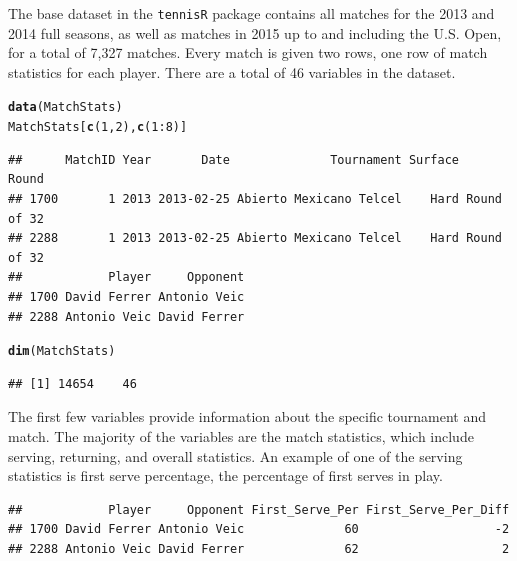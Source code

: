 \documentclass{article}\usepackage[]{graphicx}\usepackage[]{color}
\makeatletter
\newcommand{\hlnum}[1]{\textcolor[rgb]{0.686,0.059,0.569}{#1}}%
\newcommand{\hlopt}[1]{\textcolor[rgb]{0,0,0}{#1}}%
\newcommand{\hlstd}[1]{\textcolor[rgb]{0.345,0.345,0.345}{#1}}%
\newcommand{\hlkwd}[1]{\textcolor[rgb]{0.737,0.353,0.396}{\textbf{#1}}}%
\newenvironment{kframe}{%
 \def\at@end@of@kframe{}%
 \ifinner\ifhmode%
  \def\at@end@of@kframe{\end{minipage}}%
  \begin{minipage}{\columnwidth}%
 \fi\fi%
 \def\FrameCommand##1{\hskip\@totalleftmargin \hskip-\fboxsep
 \colorbox{shadecolor}{##1}\hskip-\fboxsep
     \hskip-\linewidth \hskip-\@totalleftmargin \hskip\columnwidth}%
 \MakeFramed {\advance\hsize-\width
   \@totalleftmargin\z@ \linewidth\hsize
   \@setminipage}}%
 {\par\unskip\endMakeFramed%
 \at@end@of@kframe}
\newenvironment{knitrout}{}{} %
\numberwithin{equation}{section} %
\newcommand{\pkg}[1]{{\texttt{#1}}}
\makeatother
\begin{document}
The base dataset in the \pkg{tennisR} package contains all matches for the 2013 and 2014 full seasons, as well as matches in 2015 up to and including the U.S. Open, for a total of 7,327 matches.  Every match is given two rows, one row of match statistics for each player.  There are a total of 46 variables in the dataset.



\begin{knitrout}
\color{fgcolor}\begin{kframe}
\begin{alltt}
\hlkwd{data}\hlstd{(MatchStats)}
\hlstd{MatchStats[}\hlkwd{c}\hlstd{(}\hlnum{1}\hlstd{,}\hlnum{2}\hlstd{),}\hlkwd{c}\hlstd{(}\hlnum{1}\hlopt{:}\hlnum{8}\hlstd{)]}
\end{alltt}
\begin{verbatim}
##      MatchID Year       Date              Tournament Surface       Round
## 1700       1 2013 2013-02-25 Abierto Mexicano Telcel    Hard Round of 32
## 2288       1 2013 2013-02-25 Abierto Mexicano Telcel    Hard Round of 32
##            Player     Opponent
## 1700 David Ferrer Antonio Veic
## 2288 Antonio Veic David Ferrer
\end{verbatim}
\begin{alltt}
\hlkwd{dim}\hlstd{(MatchStats)}
\end{alltt}
\begin{verbatim}
## [1] 14654    46
\end{verbatim}
\end{kframe}
\end{knitrout}


The first few variables provide information about the specific tournament and match.  The majority of the variables are the match statistics, which include serving, returning, and overall statistics.  An example of one of the serving statistics is first serve percentage, the percentage of first serves in play.

\begin{knitrout}
\color{fgcolor}\begin{kframe}
\begin{verbatim}
##            Player     Opponent First_Serve_Per First_Serve_Per_Diff
## 1700 David Ferrer Antonio Veic              60                   -2
## 2288 Antonio Veic David Ferrer              62                    2
\end{verbatim}
\end{kframe}
\end{knitrout}
\end{document}
